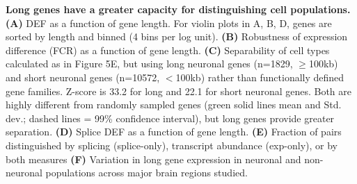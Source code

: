 \textbf{Long genes have a greater capacity for distinguishing cell populations. (A)} DEF as a function of gene length. For violin plots in A, B, D, genes are sorted by length and binned (4 bins per log unit). \textbf{(B)} Robustness of expression difference (FCR) as a function of gene length. \textbf{(C)} Separability of cell types calculated as in Figure 5E, but using long neuronal genes (n=1829, $\geq$100kb) and short neuronal genes (n=10572, $\lt$100kb) rather than functionally defined gene families. Z-score is 33.2 for long and 22.1 for short neuronal genes. Both are highly different from randomly sampled genes (green solid lines mean and Std. dev.; dashed lines = 99\% confidence interval), but long genes provide greater separation. \textbf{(D)} Splice DEF as a function of gene length. \textbf{(E)} Fraction of pairs distinguished by splicing (splice-only), transcript abundance (exp-only), or by both measures \textbf{(F)} Variation in long gene expression in neuronal and non-neuronal populations across major brain regions studied.  